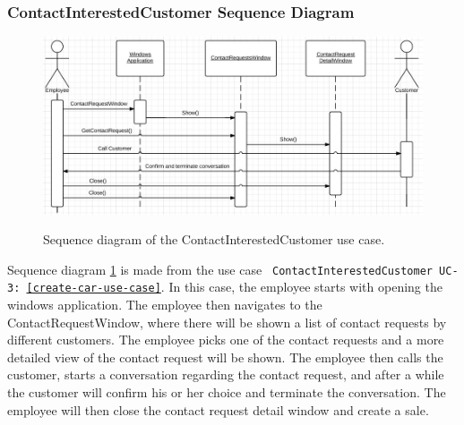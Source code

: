 \subsubsection{ContactInterestedCustomer Sequence Diagram}
\begin{figure}[H]
	\centering
		\includegraphics[width=\textwidth]{Figures/SequenceDiagram-ContactInterestedCustomer}\\
	\caption{Sequence diagram of the ContactInterestedCustomer use case.}
  \label{fig:SequenceDiagram-ContactInterestedCustomer}
\end{figure}

Sequence diagram \ref{fig:SequenceDiagram-ContactInterestedCustomer} is made from the use case \texttt{ ContactInterestedCustomer UC-3: \ref{create-car-use-case}}. 
In this case, the employee starts with opening the windows application. The employee then navigates to the ContactRequestWindow, where there will be shown a list of contact requests by different customers. The employee picks one of the contact requests and a more detailed view of the contact request will be shown. The employee then calls the customer, starts a conversation regarding the contact request, and after a while the customer will confirm his or her choice and terminate the conversation. The employee will then close the contact request detail window and create a sale.

